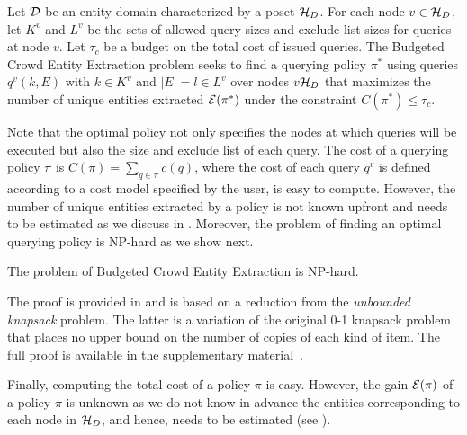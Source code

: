 \begin{problem}
Let $\mathcal{D}$ be an entity domain characterized by a poset $\mathcal{H}_D$. For each node $v \in \mathcal{H}_D$, let $K^v$ and $L^v$ be the sets of allowed query sizes and exclude list sizes for queries at node $v$. Let $\tau_c$ be a budget on the total cost of issued queries. The Budgeted Crowd Entity Extraction problem seeks to find a querying policy $\pi^*$ using queries $q^v(k,E)$ with $k \in K^v$ and $|E| = l \in L^v$ over nodes $v \mathcal{H}_D$ that maximizes the number of unique entities extracted $\mathcal{E}(\pi^*)$ under the constraint $C(\pi^*) \leq \tau_c$.
\end{problem}
Note that the optimal policy not only specifies the nodes at which queries will be executed but also the size and exclude list of each query. The cost of a querying policy $\pi$ is $C(\pi) = \sum_{q \in \pi} c(q)$, where the cost of each query $q^v$ is defined according to a cost model specified by the user, is easy to compute. However, the number of unique entities extracted by a policy is not known upfront and needs to be estimated as we discuss in . Moreover, the problem of finding an optimal querying policy is NP-hard as we show next. 

\begin{theorem}[{\bf NP-Hardness}]
The problem of Budgeted Crowd Entity Extraction is NP-hard.
\end{theorem}
The proof is provided in  and is based on a reduction from the {\em unbounded knapsack} problem. The latter is a variation of the original 0-1 knapsack problem that places no upper bound on the number of copies of each kind of item. The full proof is available in the supplementary material~\cite{cruxsup}.

Finally, computing the total cost of a policy $\pi$ is easy. However, the gain $\mathcal{E}(\pi)$ of a policy $\pi$ is unknown as we do not know in advance the entities corresponding to each node in $\mathcal{H}_D$, and hence, needs to be estimated (see ). 

